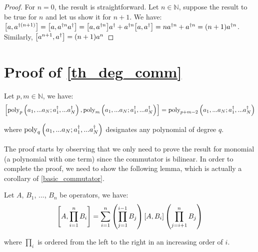 \begin{proof}
    For $n = 0$, the result is straightforward. Let $n \in \mathbb{N}$, suppose the result to be true for $n$ and let us show it for $n+1$. We have: $\commutator{a}{a^{\dagger (n+1)}} = \commutator{a}{a^{\dagger n} a^\dagger} = \commutator{a}{a^{\dagger n}} a^\dagger + a^{\dagger n} \commutator{a}{a^\dagger} = n a^{\dagger n} + a^{\dagger n} = (n+1) a^{\dagger n}$. Similarly, $\commutator{a^{n+1}}{a^\dagger} = (n+1) a^{n}$
\end{proof}

\section{Proof of \autoref{th_deg_comm}} \label{proof-th_deg_comm}
\begin{theorem}
    Let $p, m \in \mathbb{N}$, we have:
    \begin{equation}
        \commutator{\poly{p}{a_1, ... a_N; a^\dagger_1, ... a^\dagger_N}}{\poly{m}{a_1, ... a_N; a^\dagger_1, ... a^\dagger_N}} = \poly{p+m-2}{a_1, ... a_N; a^\dagger_1, ... a^\dagger_N}
    \end{equation}

    where $\text{poly}_{q}\left(a_1, ... a_N; a^\dagger_1, ... a^\dagger_N\right)$ designates any polynomial of degree $q$.
\end{theorem}

The proof starts by observing that we only need to prove the result for monomial (a polynomial with one term) since the commutator is bilinear. In order to complete the proof, we need to show the following lemma, which is actually a corollary of \ref{basic_commutator}.

\begin{lemma}
    Let $A$, $B_1$, ..., $B_n$ be operators, we have:
    \begin{equation}
        \commutator{A}{\prod_{i = 1}^n B_i} = \sum_{i = 1}^n \left(\prod_{j = 1}^{i-1} B_j \right) \commutator{A}{B_i} \left(\prod_{j = i+1}^{n} B_j \right)
    \end{equation}
\end{lemma}

where $\prod_i$ is ordered from the left to the right in an increasing order of $i$.

